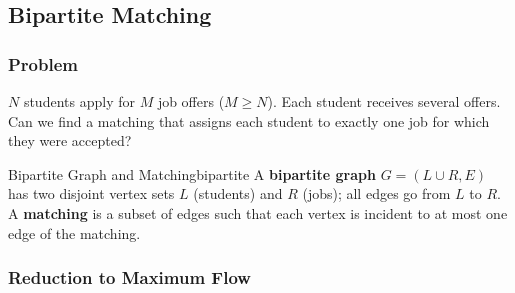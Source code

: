 \subsection{Bipartite Matching}

\subsubsection{Problem}

$N$ students apply for $M$ job offers ($M \ge N$). Each student 
receives several offers. Can we find a matching that assigns each student 
to exactly one job for which they were accepted?

\begin{definition}{Bipartite Graph and Matching}{bipartite}
A \textbf{bipartite graph} $G = (L \cup R, E)$ has two disjoint 
vertex sets $L$ (students) and $R$ (jobs); all edges go from 
$L$ to $R$. A \textbf{matching} is a subset of edges such that each 
vertex is incident to at most one edge of the matching.
\end{definition}

\subsubsection{Reduction to Maximum Flow}

